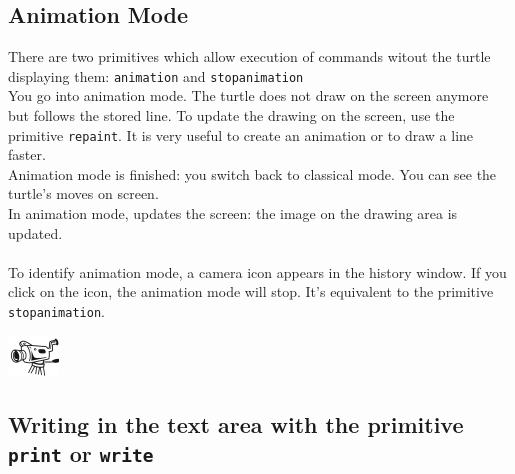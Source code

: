\subsection{Animation Mode}
There are two primitives which allow execution of commands witout the turtle displaying them: \texttt{animation} and \texttt{stopanimation}\\
You go into animation mode. The turtle does not draw on the screen anymore but follows the stored line. To update the drawing on the screen, use the primitive \texttt{repaint}. It is very useful to create an animation or to draw a line faster.\\
Animation mode is finished: you switch back to classical mode. You can see the turtle's moves on screen.\\
In animation mode, updates the screen: the image on the drawing area is updated.\\ \\
To identify animation mode, a camera icon appears in the history window. If you click on the icon, the animation mode will stop. It's equivalent to the primitive \texttt{stopanimation}.
\begin{center}
   \includegraphics[scale=2.5]{pics/animation.png}
\end{center} 

\subsection{Writing in the text area with the primitive \texttt{print} or \texttt{write}}

